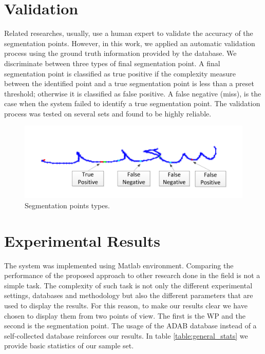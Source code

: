 \documentclass[10pt, conference, compsocconf]{IEEEtran}
\begin{document}
\section{Validation}
\label{sec:validation}
Related researches, usually, use a human expert to validate the accuracy of the segmentation points. However, in this work, we applied an automatic validation process using the ground truth information provided by the database. We discriminate between three types of final segmentation point. A final segmentation point is classified as true positive if the complexity measure between the identified point and a true segmentation point is less than a preset threshold; otherwise it is classified as false positive. A false negative (miss), is the case when the system failed to identify a true segmentation point. The validation process was tested on several sets and found to be highly reliable.\\

\begin{figure}
\centering
\includegraphics[width=0.8\columnwidth]{./figures/sp_types}
\caption{Segmentation points types.}
\label{fig:sp_types}
\end{figure}

\section{Experimental Results}
\label{sec:results}
The system was implemented using Matlab environment. Comparing the performance of the proposed approach to other research done in the field is not a simple task. The complexity of such task is not only the different experimental settings, databases and methodology but also the different parameters that are used to display the results. For this reason, to make our results clear we have chosen to display them from two points of view. The first is the WP and the second is the segmentation point. The usage of the ADAB database instead of a self-collected database reinforces our results. In table \ref{table:general_stats} we provide basic statistics of our sample set.\\
\end{document}

